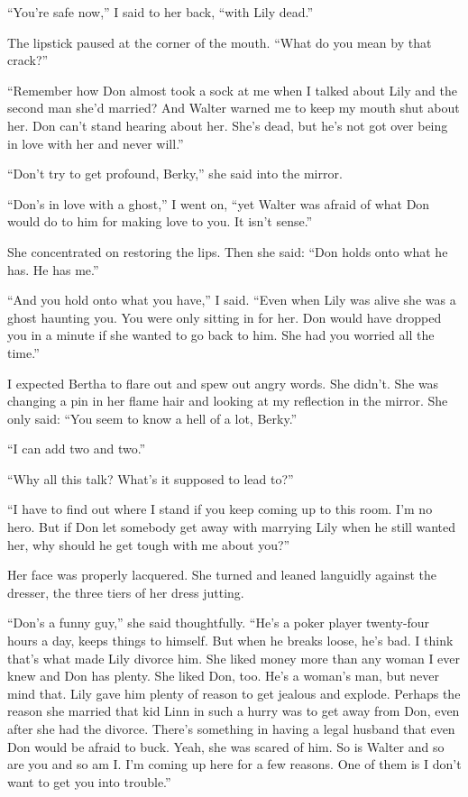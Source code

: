 \documentclass{novel}
\begin{document}
“You’re safe now,” I said to her back, “with Lily dead.”

The lipstick paused at the corner of the mouth. “What do you mean by that crack?”

“Remember how Don almost took a sock at me when I talked about Lily and the second man she’d married? And Walter warned me to keep my mouth shut about her. Don can’t stand hearing about her. She’s dead, but he’s not got over being in love with her and never will.”

“Don’t try to get profound, Berky,” she said into the mirror.

“Don’s in love with a ghost,” I went on, “yet Walter was afraid of what Don would do to him for making love to you. It isn’t sense.”

She concentrated on restoring the lips. Then she said: “Don holds onto what he has. He has me.”

“And you hold onto what you have,” I said. “Even when Lily was alive she was a ghost haunting you. You were only sitting in for her. Don would have dropped you in a minute if she wanted to go back to him. She had you worried all the time.”

I expected Bertha to flare out and spew out angry words. She didn’t. She was changing a pin in her flame hair and looking at my reflection in the mirror. She only said: “You seem to know a hell of a lot, Berky.”

“I can add two and two.”

“Why all this talk? What’s it supposed to lead to?”

“I have to find out where I stand if you keep coming up to this room. I’m no hero. But if Don let somebody get away with marrying Lily when he still wanted her, why should he get tough with me about you?”

\scenestars

Her face was properly lacquered. She turned and leaned languidly against the dresser, the three tiers of her dress jutting.

“Don’s a funny guy,” she said thoughtfully. “He’s a poker player twenty-four hours a day, keeps things to himself. But when he breaks loose, he’s bad. I think that’s what made Lily divorce him. She liked money more than any woman I ever knew and Don has plenty. She liked Don, too. He’s a woman’s man, but never mind that. Lily gave him plenty of reason to get jealous and explode. Perhaps the reason she married that kid Linn in such a hurry was to get away from Don, even after she had the divorce. There’s something in having a legal husband that even Don would be afraid to buck. Yeah, she was scared of him. So is Walter and so are you and so am I. I’m coming up here for a few reasons. One of them is I don’t want to get you into trouble.”
\end{document}
